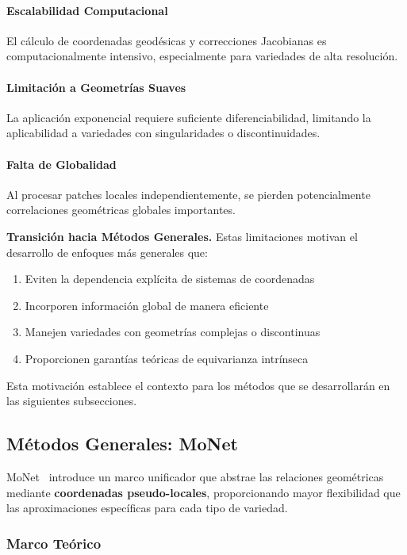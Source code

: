 \paragraph{Escalabilidad Computacional}
El cálculo de coordenadas geodésicas y correcciones Jacobianas es computacionalmente intensivo, especialmente para variedades de alta resolución.

\paragraph{Limitación a Geometrías Suaves}
La aplicación exponencial requiere suficiente diferenciabilidad, limitando la aplicabilidad a variedades con singularidades o discontinuidades.

\paragraph{Falta de Globalidad}
Al procesar patches locales independientemente, se pierden potencialmente correlaciones geométricas globales importantes.

\textbf{Transición hacia Métodos Generales.} Estas limitaciones motivan el desarrollo de enfoques más generales que:
\begin{enumerate}
    \item Eviten la dependencia explícita de sistemas de coordenadas
    \item Incorporen información global de manera eficiente
    \item Manejen variedades con geometrías complejas o discontinuas
    \item Proporcionen garantías teóricas de equivarianza intrínseca
\end{enumerate}
Esta motivación establece el contexto para los métodos que se desarrollarán en las siguientes subsecciones.

\subsection{Métodos Generales: MoNet}\label{subsec:monet}

MoNet~\citep{DBLP:journals/corr/MontiBMRSB16} introduce un marco unificador que abstrae las relaciones geométricas mediante \textbf{coordenadas pseudo-locales}, proporcionando mayor flexibilidad que las aproximaciones específicas para cada tipo de variedad.

\subsubsection{Marco Teórico}

